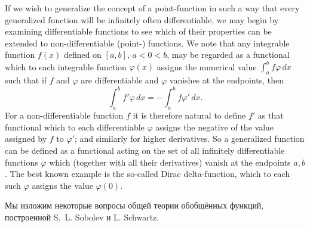 

\begin{sourcebox}
If we wish to generalize the concept of a point-function in such a way that every generalized function will be infinitely often differentiable, we may begin by examining differentiable functions to see which of their properties can be extended to non-differentiable (point-) functions. We note that any integrable function $f(x)$ defined on $[a,b]$, $a<0<b$, may be regarded as a functional which to each integrable function $\varphi(x)$ assigns the numerical value $\int_a^b f\varphi\,dx$ such that if $f$ and $\varphi$ are differentiable and $\varphi$ vanishes at the endpoints, then
\[
\int_a^b f'\varphi\,dx=-\int_a^b f\varphi'\,dx.
\]
For a non-differentiable function $f$ it is therefore natural to define $f'$ as that functional which to each differentiable $\varphi$ assigns the negative of the value assigned by $f$ to $\varphi'$; and similarly for higher derivatives. So a generalized function can be defined as a functional acting on the set of all infinitely differentiable functions $\varphi$ which (together with all their derivatives) vanish at the endpoints $a,b$. The best known example is the so-called Dirac delta-function, which to each such $\varphi$ assigns the value $\varphi(0)$.
\end{sourcebox}

\begin{rusblock}
Мы изложим некоторые вопросы общей теории обобщённых функций, построенной S.~L. Sobolev и L. Schwartz.
\end{rusblock}

